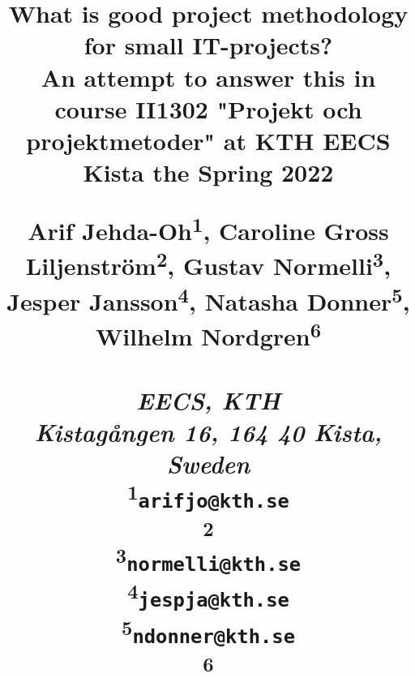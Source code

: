 \title{
    What is good project methodology for small IT-projects?\\
{\normalsize An attempt to answer this in course II1302 "Projekt och projektmetoder"
at KTH EECS Kista the Spring 2022}

\begin{center}
    \large{ 
        Arif Jehda-Oh\textsuperscript{1}, Caroline Gross Liljenström\textsuperscript{2}, Gustav Normelli\textsuperscript{3}, Jesper Jansson\textsuperscript{4}, Natasha Donner\textsuperscript{5}, Wilhelm Nordgren\textsuperscript{6}\\
        \textit{\\EECS, KTH\\
                Kistagången 16, 164 40 Kista, Sweden\\}
        \textsuperscript{1}\texttt{arifjo@kth.se}\\
        \textsuperscript{2}\texttt{}\\
        \textsuperscript{3}\texttt{normelli@kth.se}\\
        \textsuperscript{4}\texttt{jespja@kth.se}\\
        \textsuperscript{5}\texttt{ndonner@kth.se}\\
        \textsuperscript{6}\texttt{}\\
        
    }
\end{center}
}

\author{}




\maketitle